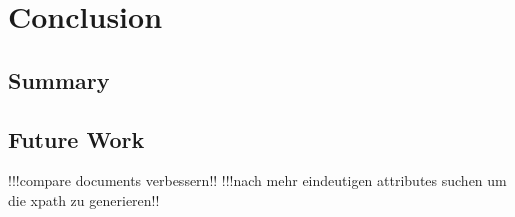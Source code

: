 \chapter{Conclusion}
\label{Conclusion}

\section{Summary}
\label{Summary}

\section{Future Work}
\label{Future Work}
!!!compare documents verbessern!!
!!!nach mehr eindeutigen attributes suchen um die xpath zu generieren!!

